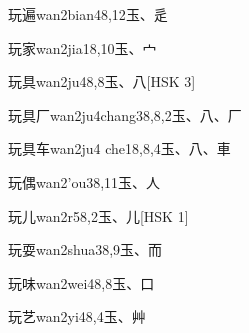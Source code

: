 \begin{EntryWithPhonetic}{玩遍}{wan2bian4}{8,12}{⽟、⾡}
\end{EntryWithPhonetic}

\begin{EntryWithPhonetic}{玩家}{wan2jia1}{8,10}{⽟、⼧}
\end{EntryWithPhonetic}

\begin{EntryWithPhonetic}{玩具}{wan2ju4}{8,8}{⽟、⼋}[HSK 3]
\end{EntryWithPhonetic}

\begin{EntryWithPhonetic}{玩具厂}{wan2ju4chang3}{8,8,2}{⽟、⼋、⼚}
\end{EntryWithPhonetic}

\begin{EntryWithPhonetic}{玩具车}{wan2ju4 che1}{8,8,4}{⽟、⼋、⾞}
\end{EntryWithPhonetic}

\begin{EntryWithPhonetic}{玩偶}{wan2'ou3}{8,11}{⽟、⼈}
\end{EntryWithPhonetic}

\begin{EntryWithPhonetic}{玩儿}{wan2r5}{8,2}{⽟、⼉}[HSK 1]
\end{EntryWithPhonetic}

\begin{EntryWithPhonetic}{玩耍}{wan2shua3}{8,9}{⽟、⽽}
\end{EntryWithPhonetic}

\begin{EntryWithPhonetic}{玩味}{wan2wei4}{8,8}{⽟、⼝}
\end{EntryWithPhonetic}

\begin{EntryWithPhonetic}{玩艺}{wan2yi4}{8,4}{⽟、⾋}
\end{EntryWithPhonetic}

